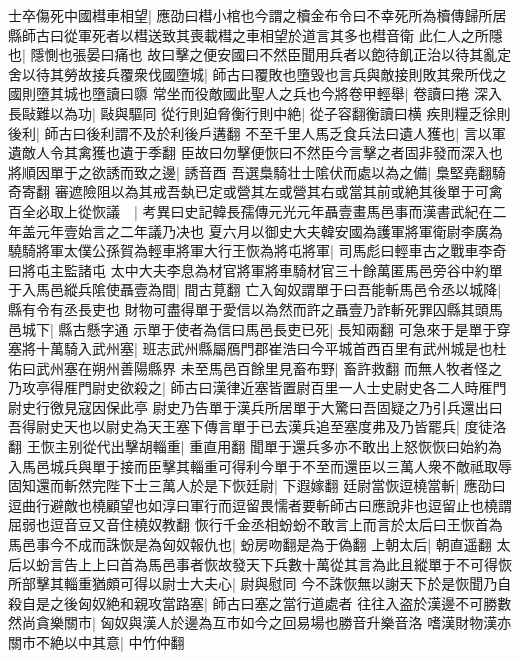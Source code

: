 士卒傷死中國槥車相望|{
	應劭曰槥小棺也今謂之櫝金布令曰不幸死所為櫝傳歸所居縣師古曰從軍死者以槥送致其喪載槥之車相望於道言其多也槥音衛}
此仁人之所隱也|{
	隱惻也張晏曰痛也}
故曰擊之便安國曰不然臣聞用兵者以飽待飢正治以待其亂定舍以待其勞故接兵覆衆伐國墮城|{
	師古曰覆敗也墮毁也言兵與敵接則敗其衆所伐之國則墮其城也墮讀曰隳}
常坐而役敵國此聖人之兵也今將卷甲輕舉|{
	卷讀曰捲}
深入長敺難以為功|{
	敺與驅同}
從行則廹脅衡行則中絶|{
	從子容翻衡讀曰横}
疾則糧乏徐則後利|{
	師古曰後利謂不及於利後戶遘翻}
不至千里人馬乏食兵法曰遺人獲也|{
	言以軍遺敵人令其禽獲也遺于季翻}
臣故曰勿擊便恢曰不然臣今言擊之者固非發而深入也將順因單于之欲誘而致之邊|{
	誘音酉}
吾選梟騎壮士隂伏而處以為之備|{
	梟堅堯翻騎奇寄翻}
審遮險阻以為其戒吾埶已定或營其左或營其右或當其前或絶其後單于可禽百全必取上從恢議　|{
	考異曰史記韓長孺傳元光元年聶壹畫馬邑事而漢書武紀在二年盖元年壹始言之二年議乃决也}
夏六月以御史大夫韓安國為護軍將軍衛尉李廣為驍騎將軍太僕公孫賀為輕車將軍大行王恢為將屯將軍|{
	司馬彪曰輕車古之戰車李奇曰將屯主監諸屯}
太中大夫李息為材官將軍將車騎材官三十餘萬匿馬邑旁谷中約單于入馬邑縱兵隂使聶壹為間|{
	間古莧翻}
亡入匈奴謂單于曰吾能斬馬邑令丞以城降|{
	縣有令有丞長吏也}
財物可盡得單于愛信以為然而許之聶壹乃詐斬死罪囚縣其頭馬邑城下|{
	縣古懸字通}
示單于使者為信曰馬邑長吏已死|{
	長知兩翻}
可急來于是單于穿塞將十萬騎入武州塞|{
	班志武州縣屬鴈門郡崔浩曰今平城首西百里有武州城是也杜佑曰武州塞在朔州善陽縣界}
未至馬邑百餘里見畜布野|{
	畜許救翻}
而無人牧者怪之乃攻亭得㕍門尉史欲殺之|{
	師古曰漢律近塞皆置尉百里一人士史尉史各二人時㕍門尉史行徼見寇因保此亭}
尉史乃告單于漢兵所居單于大驚曰吾固疑之乃引兵還出曰吾得尉史天也以尉史為天王塞下傳言單于已去漢兵追至塞度弗及乃皆罷兵|{
	度徒洛翻}
王恢主别從代出擊胡輜重|{
	重直用翻}
聞單于還兵多亦不敢出上怒恢恢曰始約為入馬邑城兵與單于接而臣擊其輜重可得利今單于不至而還臣以三萬人衆不敵祗取辱固知還而斬然完陛下士三萬人於是下恢廷尉|{
	下遐嫁翻}
廷尉當恢逗橈當斬|{
	應劭曰逗曲行避敵也橈顧望也如淳曰軍行而逗留畏懦者要斬師古曰應說非也逗留止也橈謂屈弱也逗音豆又音住橈奴教翻}
恢行千金丞相蚡蚡不敢言上而言於太后曰王恢首為馬邑事今不成而誅恢是為匈奴報仇也|{
	蚡房吻翻是為于偽翻}
上朝太后|{
	朝直遥翻}
太后以蚡言告上上曰首為馬邑事者恢故發天下兵數十萬從其言為此且縱單于不可得恢所部擊其輜重猶頗可得以尉士大夫心|{
	尉與慰同}
今不誅恢無以謝天下於是恢聞乃自殺自是之後匈奴絶和親攻當路塞|{
	師古曰塞之當行道處者}
往往入盗於漢邊不可勝數然尚貪樂關市|{
	匈奴與漢人於邊為互市如今之回易場也勝音升樂音洛}
嗜漢財物漢亦關市不絶以中其意|{
	中竹仲翻}


